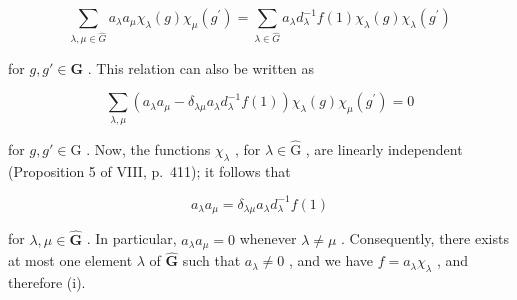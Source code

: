 \[
\sum_ {\lambda , \mu \in \widehat {G}} a _ {\lambda}   a _ {\mu}   \chi_ {\lambda} (g)   \chi_ {\mu} (g ^ {\prime}) = \sum_ {\lambda \in \widehat {G}} a _ {\lambda}   d _ {\lambda} ^ {- 1}   f (1)   \chi_ {\lambda} (g)   \chi_ {\lambda} (g ^ {\prime})\tag{37}
\]

for \(g, g' \in \mathbf{G}\) . This relation can also be written as

\[
\sum_ {\lambda , \mu} (a _ {\lambda} a _ {\mu} - \delta_ {\lambda \mu} a _ {\lambda} d _ {\lambda} ^ {- 1} f (1)) \chi_ {\lambda} (g) \chi_ {\mu} (g ^ {\prime}) = 0\tag{38}
\]

for \(g, g' \in \mathrm{G}\) . Now, the functions \(\chi_{\lambda}\) , for \(\lambda \in \widehat{\mathrm{G}}\) , are linearly independent (Proposition 5 of VIII, p.~411); it follows that

\[
a _ {\lambda} a _ {\mu} = \delta_ {\lambda \mu} a _ {\lambda} d _ {\lambda} ^ {- 1} f (1)
\]

for \(\lambda, \mu \in \widehat{\mathbf{G}}\) . In particular, \(a_{\lambda}a_{\mu} = 0\) whenever \(\lambda \neq \mu\) . Consequently, there exists at most one element \(\lambda\) of \(\widehat{\mathbf{G}}\) such that \(a_{\lambda} \neq 0\) , and we have \(f = a_{\lambda}\chi_{\lambda}\) , and therefore (i).

